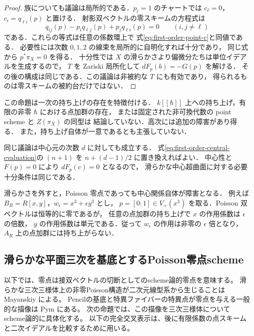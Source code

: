 \begin{proof}
族についても議論は局所的である．$p_\ell=1$ のチャートでは
$c_\ell=0$，$c_i=q_{\ell i}(p)$ と置ける．
射影双ベクトルの零スキームの方程式は
\begin{equation}\label{eq:projective-poisson-zero-chart}
 q_{ij}(p)-p_iq_{\ell j}(p)+p_jq_{\ell i}(p)=0
 \qquad(i,j\neq\ell)
\end{equation}
である．これらの等式は任意の係数環上で
式\eqref{eq:first-order-point-c}と同値である．
必要性には次数 $0,1,2$ の線束を局所的に自明化すれば十分であり，
同じ式から $p^*\pi_X=0$ を得る．
十分性では $X$ の滑らかさより偏微分たちは単位イデアルを生成するので，
$T$ を Zariski 局所化して $dF_p(b)=-G(p)$ を解ける．
その後の構成は同じである．この議論は非被約な $T$ にも有効であり，
得られるものは零スキームの被約台だけではない．
\end{proof}

\begin{remark}
この命題は一次の持ち上げの存在を特徴付ける．
$k[[\hbar]]$ 上への持ち上げ，有限の非零 $\hbar$ における点加群の存在，
または固定された非可換代数の point scheme と $Z(\pi_X)$ の同型は
結論していない．高次には追加の障害があり得る．
また，持ち上げ自体が一意であるとも主張していない．
\end{remark}

\begin{remark}[一般次数]
同じ議論は中心元の次数 $d$ に対しても成立する．
式\eqref{eq:first-order-central-evaluation}の $(n+1)$ を
$n+(d-1)/2$ に置き換えればよい．
中心性と $F(p)=0$ により $dF_p(c)=0$ となるので，
滑らかな中心超曲面に対する必要十分条件は同じである．
\end{remark}

\begin{remark}[滑らかさの必要性]
滑らかさを外すと，Poisson 零点であっても中心関係自体が障害となる．
例えば $B_R=R[x,y]$，$w_\epsilon=x^3+\epsilon y^3$ とし，
$p=[0:1]\in V_+(x^3)$ を取る．Poisson 双ベクトルは恒等的に零であるが，
任意の点加群の持ち上げで $x$ の作用係数は $\epsilon$ の倍数，
$y$ の作用係数は単元である．従って $w_\epsilon$ の作用は非零の
$\epsilon$ 倍となり，$A_R$ 上の点加群には持ち上がらない．
\end{remark}


\subsection{滑らかな平面三次を基底とするPoisson零点scheme}
\label{subsec:poisson-zero-geometry}

以下では、零点は接双ベクトルの切断としてのscheme論的零点を意味する。
滑らかな三次三様体上の非零Poisson構造が二次元線型系から生じることは
Mayanskiy \cite[\S2.2, Lemma~2 and Theorem~1]{Mayanskiy}による。
Pencilの基底と特異ファイバーの特異点が零点を与える一般的な描像は
Pym \cite[\S3.2.2]{PymSurvey}にある。
次の命題では、この描像を三次三様体についてscheme論的に具体化する。
以下の完全交叉表示は、後に有限係数の点スキームと二次イデアルを比較するために用いる。

